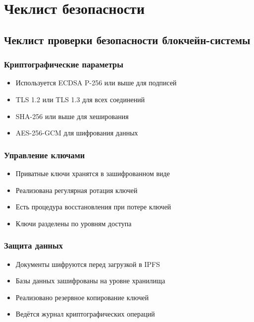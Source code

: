 \documentclass[a4paper,14pt]{extreport}
\begin{document}
\chapter{Чеклист безопасности}

\section*{Чеклист проверки безопасности блокчейн-системы}

\subsection*{Криптографические параметры}
\begin{itemize}
    \item[$\square$] Используется ECDSA P-256 или выше для подписей
    \item[$\square$] TLS 1.2 или TLS 1.3 для всех соединений
    \item[$\square$] SHA-256 или выше для хеширования
    \item[$\square$] AES-256-GCM для шифрования данных
\end{itemize}

\subsection*{Управление ключами}
\begin{itemize}
    \item[$\square$] Приватные ключи хранятся в зашифрованном виде
    \item[$\square$] Реализована регулярная ротация ключей
    \item[$\square$] Есть процедура восстановления при потере ключей
    \item[$\square$] Ключи разделены по уровням доступа
\end{itemize}

\subsection*{Защита данных}
\begin{itemize}
    \item[$\square$] Документы шифруются перед загрузкой в IPFS
    \item[$\square$] Базы данных зашифрованы на уровне хранилища
    \item[$\square$] Реализовано резервное копирование ключей
    \item[$\square$] Ведётся журнал криптографических операций
\end{itemize}
\end{document}
